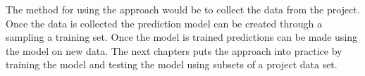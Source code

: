 The method for using the approach would be to collect the data from the project. Once the data is collected the prediction model can be created through a sampling a training set. Once the model is trained predictions can be made using the model on new data. The next chapters puts the approach into practice by training the model and testing the model using subsets of a project data set.